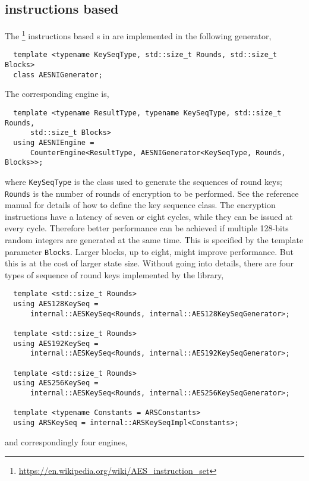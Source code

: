 \subsection{\protect\aesni instructions based \protect\rng}
\label{sub:AES-NI instructions based RNG}

The \aesni\footnote{\url{https://en.wikipedia.org/wiki/AES_instruction_set}}
instructions based \rng{}s in \textcite{Salmon:2011um} are implemented in the
following generator,
\begin{Verbatim}
  template <typename KeySeqType, std::size_t Rounds, std::size_t Blocks>
  class AESNIGenerator;
\end{Verbatim}
The corresponding \rng engine is,
\begin{Verbatim}
  template <typename ResultType, typename KeySeqType, std::size_t Rounds,
      std::size_t Blocks>
  using AESNIEngine =
      CounterEngine<ResultType, AESNIGenerator<KeySeqType, Rounds, Blocks>>;
\end{Verbatim}
where \verb|KeySeqType| is the class used to generate the sequences of round
keys; \verb|Rounds| is the number of rounds of \aes encryption to be performed.
See the reference manual for details of how to define the key sequence class.
The \aesni encryption instructions have a latency of seven or eight cycles,
while they can be issued at every cycle. Therefore better performance can be
achieved if multiple 128-bits random integers are generated at the same time.
This is specified by the template parameter \verb|Blocks|. Larger blocks, up to
eight, might improve performance. But this is at the cost of larger state size.
Without going into details, there are four types of sequence of round keys
implemented by the library,
\begin{Verbatim}
  template <std::size_t Rounds>
  using AES128KeySeq =
      internal::AESKeySeq<Rounds, internal::AES128KeySeqGenerator>;

  template <std::size_t Rounds>
  using AES192KeySeq =
      internal::AESKeySeq<Rounds, internal::AES192KeySeqGenerator>;

  template <std::size_t Rounds>
  using AES256KeySeq =
      internal::AESKeySeq<Rounds, internal::AES256KeySeqGenerator>;

  template <typename Constants = ARSConstants>
  using ARSKeySeq = internal::ARSKeySeqImpl<Constants>;
\end{Verbatim}
and correspondingly four \rng engines,
